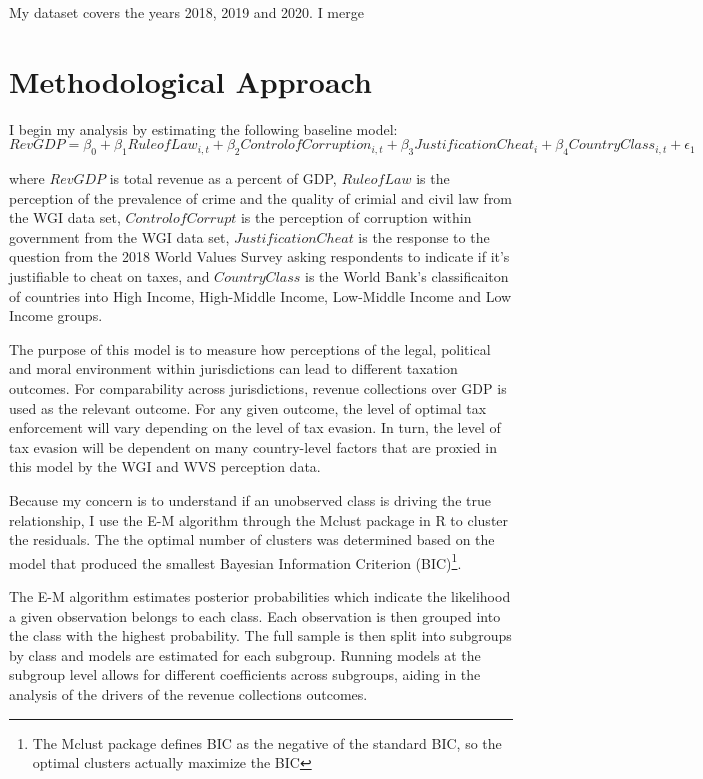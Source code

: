 \documentclass{MSword}
\begin{document}
My dataset covers the years 2018, 2019 and 2020. I merge 

\section*{Methodological Approach}
I begin my analysis by estimating the following baseline model:
$$RevGDP = \beta_0 + \beta_1 RuleofLaw_{i,t} + \beta_2 ControlofCorruption_{i,t} + \beta_3 JustificationCheat_{i} + \beta_4 CountryClass_{i,t} + \epsilon_1 $$

where $RevGDP$ is total revenue as a percent of GDP, $RuleofLaw$ is the perception of the prevalence of crime and the quality of crimial and civil law from the WGI data set, $ControlofCorrupt$ is the perception of corruption within government from the WGI data set, $JustificationCheat$ is the response to the question from the 2018 World Values Survey asking respondents to indicate if it's justifiable to cheat on taxes, and $CountryClass$ is the World Bank's classificaiton of countries into High Income, High-Middle Income, Low-Middle Income and Low Income groups. 

The purpose of this model is to measure how perceptions of the legal, political and moral environment within jurisdictions can lead to different taxation outcomes. For comparability across jurisdictions, revenue collections over GDP is used as the relevant outcome. For any given outcome, the level of optimal tax enforcement will vary depending on the level of tax evasion. In turn, the level of tax evasion will be dependent on many country-level factors that are proxied in this model by the WGI and WVS perception data.

Because my concern is to understand if an unobserved class is driving the true relationship, I use the E-M algorithm through the Mclust package in R to cluster the residuals. The the optimal number of clusters was determined based on the model that produced the smallest Bayesian Information Criterion (BIC)\footnote{The Mclust package defines BIC as the negative of the standard BIC, so the optimal clusters actually maximize the BIC}. 

The E-M algorithm estimates posterior probabilities which indicate the likelihood a given observation belongs to each class. Each observation is then grouped into the class with the highest probability. The full sample is then split into subgroups by class and models are estimated for each subgroup. Running models at the subgroup level allows for different coefficients across subgroups, aiding in the analysis of the drivers of the revenue collections outcomes.
\end{document}

